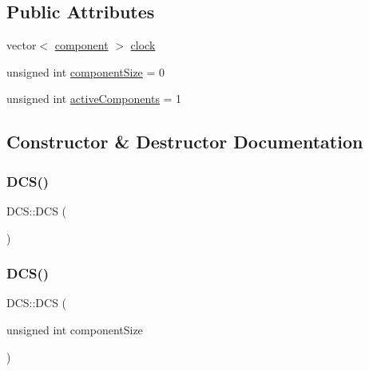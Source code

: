 \subsection*{Public Attributes}
\begin{DoxyCompactItemize}
\item 
vector$<$ \hyperlink{DCS_8h_aff5561f7728e7d2c203fbfeac4a73866}{component} $>$ \hyperlink{classDCS_adde0f06e934657f25a92b13e04d3fd7d}{clock}
\item 
unsigned int \hyperlink{classDCS_af256dc5d9b30241bfce2e12d57824bec}{component\+Size} = 0
\item 
unsigned int \hyperlink{classDCS_a0922c1733e23bf6098b71890da57e762}{active\+Components} = 1
\end{DoxyCompactItemize}


\subsection{Constructor \& Destructor Documentation}
\mbox{\label{classDCS_a9b4fbb5c80ef6b265669082703312cd6}} 
\subsubsection{\texorpdfstring{D\+C\+S()}{DCS()}\hspace{0.1cm}{\footnotesize\ttfamily [1/2]}}
{\footnotesize\ttfamily D\+C\+S\+::\+D\+CS (\begin{DoxyParamCaption}{ }\end{DoxyParamCaption})}

\mbox{\label{classDCS_ad923153aa60c70d718c1be1b47e45a61}} 
\subsubsection{\texorpdfstring{D\+C\+S()}{DCS()}\hspace{0.1cm}{\footnotesize\ttfamily [2/2]}}
{\footnotesize\ttfamily D\+C\+S\+::\+D\+CS (\begin{DoxyParamCaption}\item[{unsigned int}]{component\+Size }\end{DoxyParamCaption})}

\mbox{\label{classDCS_a7e6e0c1df0b016e246801b4347f3a208}} 
